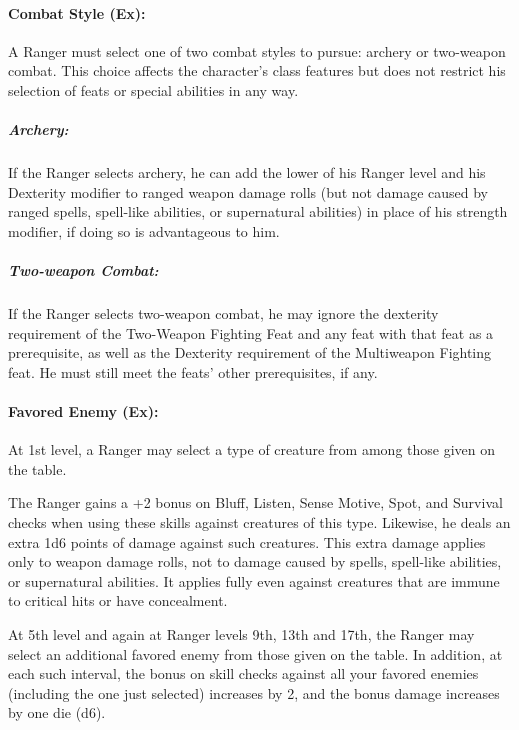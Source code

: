 \paragraph{Combat Style (Ex):}
A Ranger must select one of two combat styles to pursue: archery or two-weapon combat. This choice affects the character's class features but does not restrict his selection of feats or special abilities in any way.

\subparagraph{Archery:} If the Ranger selects archery, he can add the lower of his Ranger level and his Dexterity modifier to ranged weapon damage rolls (but not damage caused by ranged spells, spell-like abilities, or supernatural abilities) in place of his strength modifier, if doing so is advantageous to him. 

\subparagraph{Two-weapon Combat:} If the Ranger selects two-weapon combat, he may ignore the dexterity requirement of the Two-Weapon Fighting Feat and any feat with that feat as a prerequisite, as well as the Dexterity requirement of the Multiweapon Fighting feat. He must still meet the feats' other prerequisites, if any.

\paragraph{Favored Enemy (Ex):}
At 1st level, a Ranger may select a type of creature from among those given on the  table.

The Ranger gains a +2 bonus on Bluff, Listen, Sense Motive, Spot, and Survival checks when using these skills against creatures of this type. 
Likewise, he deals an extra 1d6 points of damage against such creatures. 
This extra damage applies only to weapon damage rolls, not to damage caused by spells, spell-like abilities, or supernatural abilities.
It applies fully even against creatures that are immune to critical hits or have concealment.

At 5th level and again at Ranger levels 9th, 13th and 17th, the Ranger may select an additional favored enemy from those given on the table. 
In addition, at each such interval, the bonus on skill checks against all your favored enemies (including the one just selected) increases by 2, and the bonus damage increases by one die (d6).

